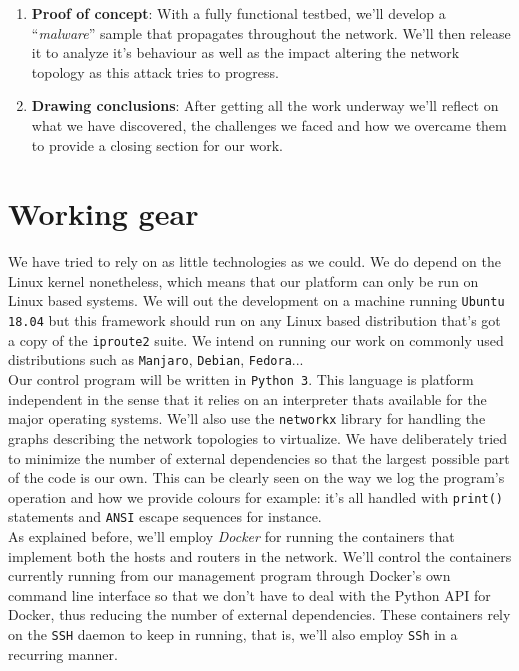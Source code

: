 \documentclass[12pt]{article}
\begin{document}
\begin{enumerate}
            \item \textbf{Proof of concept}: With a fully functional testbed, we'll develop a ``\textit{malware}'' sample that propagates throughout the network. We'll then release it to analyze it's behaviour as well as the impact altering the network topology as this attack tries to progress.
            \item \textbf{Drawing conclusions}: After getting all the work underway we'll reflect on what we have discovered, the challenges we faced and how we overcame them to provide a closing section for our work.
        \end{enumerate}

    \section{Working gear}
        We have tried to rely on as little technologies as we could. We do depend on the Linux kernel nonetheless, which means that our platform can only be run on Linux based systems. We will out the development on a machine running \texttt{Ubuntu 18.04} but this framework should run on any Linux based distribution that's got a copy of the \texttt{iproute2} suite. We intend on running our work on commonly used distributions such as \texttt{Manjaro}, \texttt{Debian}, \texttt{Fedora}...\\

        Our control program will be written in \texttt{Python 3}. This language is platform independent in the sense that it relies on an interpreter thats available for the major operating systems. We'll also use the \texttt{networkx} library for handling the graphs describing the network topologies to virtualize. We have deliberately tried to minimize the number of external dependencies so that the largest possible part of the code is our own. This can be clearly seen on the way we log the program's operation and how we provide colours for example: it's all handled with \texttt{print()} statements and \texttt{ANSI} escape sequences for instance.\\

        As explained before, we'll employ \textit{Docker} for running the containers that implement both the hosts and routers in the network. We'll control the containers currently running from our management program through Docker's own command line interface so that we don't have to deal with the Python API for Docker, thus reducing the number of external dependencies. These containers rely on the \texttt{SSH} daemon to keep in running, that is, we'll also employ \texttt{SSh} in a recurring manner.\\
\end{document}
